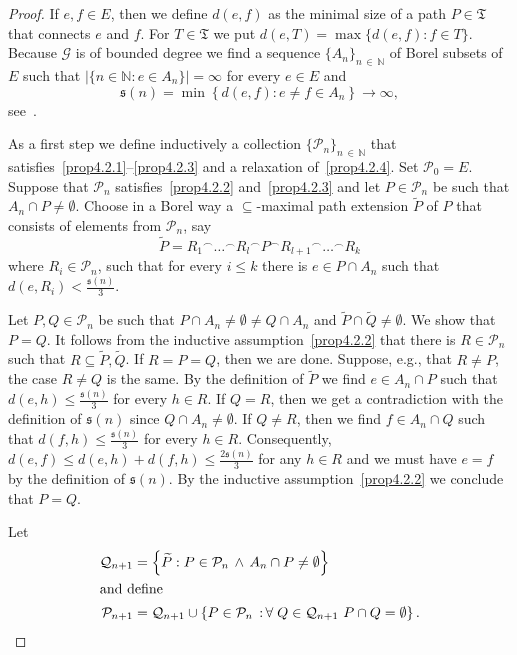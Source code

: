 \documentclass[AHL,Unicode,longabstracts,published]{cedram}
\newcommand{\clG}{\mathcal{G}}
\newcommand{\clP}{\mathcal{P}}
\newcommand{\clQ}{\mathcal{Q}}
\newcommand{\bbZ}{\mathbb{N}}
\newcommand{\frkT}{\mathfrak{T}}
\newcommand{\frks}{\mathfrak{s}}
\let\oldforall\forall
\renewcommand*{\forall}{\mathrel{\oldforall}}
\newcommand{\clG}{\mathcal{G}}
\begin{document}
\begin{proof}
If $e,f\in E$, then we define $d(e,f)$ as the minimal size of a path $P\in \frkT$ that connects $e$ and $f$. For $T\in \frkT$ we put $d(e,T)=\max\{d(e,f):f\in T\}$. Because $\clG$ is of bounded degree we find a sequence $\{A_n\}_{n\,\in\,\bbZ}$ of Borel subsets of $E$ such that $|\{n\in \bbZ:e\in A_n\}|=\infty$ for every $e\in E$ and
\[
\frks(n)=\min\left\{d(e,f):e\not =f\in A_n\right\}\to \infty,
\]
see~\cite[Proposition~4.6]{KST}.

As a first step we define inductively a collection $\{\clP_n\}_{n\,\in\,\bbZ}$ that satisfies~\eqref{prop4.2.1}--\eqref{prop4.2.3} and a relaxation of~\eqref{prop4.2.4}. Set $\clP_0=E$. Suppose that $\clP_n$ satisfies~\eqref{prop4.2.2} and~\eqref{prop4.2.3} and let $P\in \clP_n$ be such that $A_n\cap P\not=\emptyset$. Choose in a Borel way a $\subseteq$-maximal path extension $\widetilde{P}$ of $P$ that consists of elements from $\clP_n$, say
\[
\widetilde{P}={R_1}^\frown \dots ^\frown {R_l}^\frown {P} ^\frown {R_{l+1}}^\frown \dots ^\frown {R_k}
\]
where $R_i\in \clP_n$, such that for every $i\le k$ there is $e\in P\cap A_n$ such that $d(e,R_i)<\tfrac{\frks(n)}{3}$.

Let $P,Q\in \clP_n$ be such that $P\cap A_n\not=\emptyset\not=Q\cap A_n$ and $\widetilde{P}\cap \widetilde{Q}\not=\emptyset$. We show that $P=Q$. It follows from the inductive assumption~\eqref{prop4.2.2} that there is $R\in \clP_n$ such that $R\subseteq \widetilde{P},\widetilde{Q}$. If $R=P=Q$, then we are done. Suppose, e.g., that $R\not =P$, the case $R\not=Q$ is the same. By the definition of $\widetilde{P}$ we find $e\in A_n\cap P$ such that $d(e,h)\le \tfrac{\frks(n)}{3}$ for every $h\in R$. If $Q=R$, then we get a contradiction with the definition of $\frks(n)$ since $Q\cap A_n\not=\emptyset$. If $Q\not= R$, then we find $f\in A_n\cap Q$ such that $d(f,h)\le \tfrac{\frks(n)}{3}$ for every $h\in R$. Consequently, $d(e,f)\le d(e,h)+d(f,h)\le \tfrac{2\frks(n)}{3}$ for any $h\in R$ and we must have $e=f$ by the definition of $\frks(n)$. By the inductive assumption~\eqref{prop4.2.2} we conclude that $P=Q$.


Let
\begin{align*}
\clQ_{n+1} &=\left\{\widetilde{P}:P\in \clP_n \, \wedge \, A_n\cap P\not=\emptyset\right\}
\\
\intertext{and define}
\clP_{n+1} &=\clQ_{n+1}\cup \left\{P\in \clP_n\,:\,\forall Q\in \clQ_{n+1} \ P\cap Q=\emptyset\right\}.
\end{align*}


\end{proof}
\end{document}
